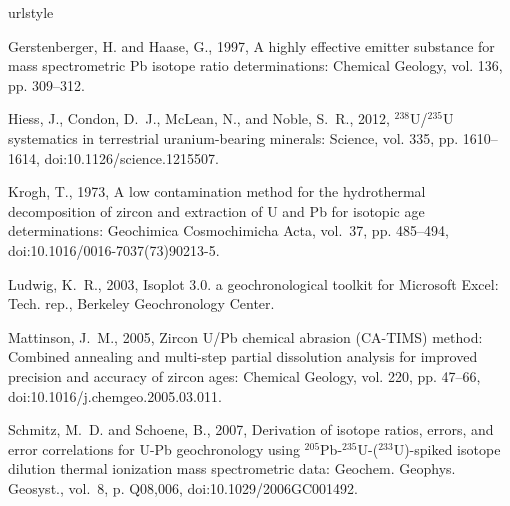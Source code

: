 \documentclass[11pt,letterpaper]{article}
\begin{document}
\small
\begin{thebibliography}{6}
\providecommand{\natexlab}[1]{#1}
\providecommand{\url}[1]{\texttt{#1}}
\providecommand{\urlprefix}{URL }
\expandafter\ifx\csname urlstyle\endcsname\relax
  \providecommand{\doi}[1]{doi:\discretionary{}{}{}#1}\else
  \providecommand{\doi}{doi:\discretionary{}{}{}\begingroup
  \urlstyle{rm}\Url}\fi

Gerstenberger, H. and Haase, G., 1997, A highly effective emitter substance for
  mass spectrometric {P}b isotope ratio determinations: Chemical Geology, vol.
  136, pp. 309--312.

Hiess, J., Condon, D.~J., McLean, N., and Noble, S.~R., 2012,
  $^{238}${U}/$^{235}${U} systematics in terrestrial uranium-bearing minerals:
  Science, vol. 335, pp. 1610--1614, \doi{10.1126/science.1215507}.

Krogh, T., 1973, A low contamination method for the hydrothermal decomposition
  of zircon and extraction of {U} and {P}b for isotopic age determinations:
  Geochimica Cosmochimicha Acta, vol.~37, pp. 485--494,
  \doi{10.1016/0016-7037(73)90213-5}.

Ludwig, K.~R., 2003, Isoplot 3.0. a geochronological toolkit for {M}icrosoft
  {E}xcel: Tech. rep., Berkeley Geochronology Center.

Mattinson, J.~M., 2005, {Zircon U/Pb chemical abrasion (CA-TIMS) method:
  Combined annealing and multi-step partial dissolution analysis for improved
  precision and accuracy of zircon ages}: Chemical Geology, vol. 220, pp.
  47--66, \doi{10.1016/j.chemgeo.2005.03.011}.

Schmitz, M.~D. and Schoene, B., 2007, {Derivation of isotope ratios, errors,
  and error correlations for U-Pb geochronology using
  $^{205}$Pb-$^{235}$U-($^{233}$U)-spiked isotope dilution thermal ionization
  mass spectrometric data}: Geochem. Geophys. Geosyst., vol.~8, p. Q08,006,
  \doi{10.1029/2006GC001492}.

\end{thebibliography}

%
%
\end{document}
